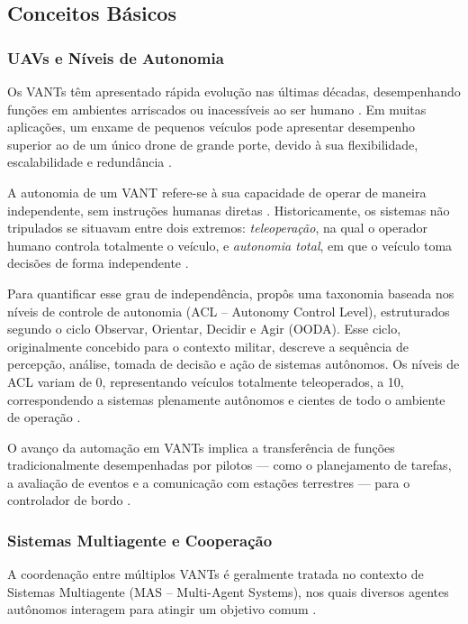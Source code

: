 \documentclass[portuguese]{sbcreviews-2025}%
\begin{document}
\subsection{Conceitos Básicos}

\subsubsection{UAVs e Níveis de Autonomia}

Os VANTs têm apresentado rápida evolução nas últimas décadas, desempenhando funções em ambientes arriscados ou inacessíveis ao ser humano \cite{dong2004behavior}. Em muitas aplicações, um enxame de pequenos veículos pode apresentar desempenho superior ao de um único drone de grande porte, devido à sua flexibilidade, escalabilidade e redundância \cite{chung2018survey}.

A autonomia de um VANT refere-se à sua capacidade de operar de maneira independente, sem instruções humanas diretas \cite{sholes2007evolution}. Historicamente, os sistemas não tripulados se situavam entre dois extremos: \textit{teleoperação}, na qual o operador humano controla totalmente o veículo, e \textit{autonomia total}, em que o veículo toma decisões de forma independente \cite{dong2004behavior}.

Para quantificar esse grau de independência, \cite{sholes2007evolution} propôs uma taxonomia baseada nos níveis de controle de autonomia (ACL – Autonomy Control Level), estruturados segundo o ciclo Observar, Orientar, Decidir e Agir (OODA). Esse ciclo, originalmente concebido para o contexto militar, descreve a sequência de percepção, análise, tomada de decisão e ação de sistemas autônomos. Os níveis de ACL variam de 0, representando veículos totalmente teleoperados, a 10, correspondendo a sistemas plenamente autônomos e cientes de todo o ambiente de operação \cite{sholes2007evolution}.

O avanço da automação em VANTs implica a transferência de funções tradicionalmente desempenhadas por pilotos — como o planejamento de tarefas, a avaliação de eventos e a comunicação com estações terrestres — para o controlador de bordo \cite{dong2004behavior}.

\subsubsection{Sistemas Multiagente e Cooperação}

A coordenação entre múltiplos VANTs é geralmente tratada no contexto de Sistemas Multiagente (MAS – Multi-Agent Systems), nos quais diversos agentes autônomos interagem para atingir um objetivo comum \cite{bu2024advancement, chung2018survey}.
\end{document}
